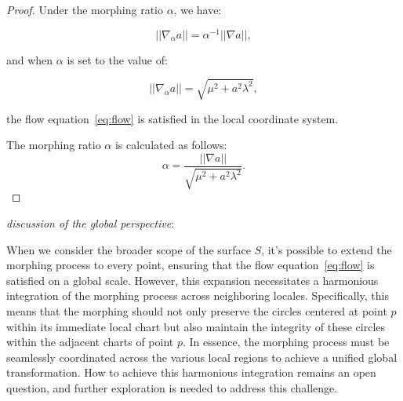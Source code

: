 \begin{proof}
    Under the morphing ratio \( \alpha \), we have:

    \begin{equation}
      ||\nabla_\alpha a|| = \alpha^{-1} ||\nabla a||,
    \end{equation}

    and when \( \alpha \) is set to the value of:

    \[ ||\nabla_\alpha a|| = \sqrt{\mu^2 + a^2 \lambda^2}, \]

    the flow equation~\eqref{eq:flow} is satisfied in the local coordinate system.

    The morphing ratio \( \alpha \) is calculated as follows:
    \begin{equation}
        \alpha = \frac{||\nabla a||}{\sqrt{\mu^2 + a^2 \lambda^2}}\label{eq:ratio}.
    \end{equation}
    \qedhere
\end{proof}

\emph{discussion of the global perspective}:

When we consider the broader scope of the surface \( S \), it's possible to extend the morphing process to every point,
ensuring that the flow equation~\eqref{eq:flow} is satisfied on a global scale.
However, this expansion necessitates a harmonious integration of the morphing process across neighboring locales.
Specifically, this means that the morphing should not only preserve the circles centered at point \( p \) within its immediate local chart
but also maintain the integrity of these circles within the adjacent charts of point \( p \).
In essence, the morphing process must be seamlessly coordinated across the various local regions to achieve a unified global transformation.
How to achieve this harmonious integration remains an open question, and further exploration is needed to address this challenge.
